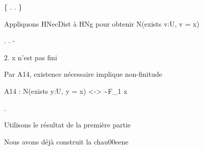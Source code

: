 \documentclass[10pt]{report}
\begin{document}
\begin{coqdoccode}
\coqdocindent{2.00em}
\{  .  . \}\coqdoceol
\coqdocindent{2.00em}
\coqdoceol
\coqdocindent{2.00em}
\begin{coqdoccomment}
\coqdocindent{0.50em}
Appliquons\coqdocindent{0.50em}
HNecDist\coqdocindent{0.50em}
à\coqdocindent{0.50em}
HNg\coqdocindent{0.50em}
pour\coqdocindent{0.50em}
obtenir\coqdocindent{0.50em}
N(exists\coqdocindent{0.50em}
v:U,\coqdocindent{0.50em}
v\coqdocindent{0.50em}
=\coqdocindent{0.50em}
x)\coqdocindent{0.50em}
\end{coqdoccomment}
\coqdoceol
\coqdocindent{2.00em}
 .  .\coqdoceol
\coqdocemptyline
\coqdocindent{1.00em}
- \begin{coqdoccomment}
\coqdocindent{0.50em}
2.\coqdocindent{0.50em}
x\coqdocindent{0.50em}
n'est\coqdocindent{0.50em}
pas\coqdocindent{0.50em}
fini\coqdocindent{0.50em}
\end{coqdoccomment}
\coqdoceol
\coqdocindent{2.00em}
\begin{coqdoccomment}
\coqdocindent{0.50em}
Par\coqdocindent{0.50em}
A14,\coqdocindent{0.50em}
existence\coqdocindent{0.50em}
nécessaire\coqdocindent{0.50em}
implique\coqdocindent{0.50em}
non-finitude\coqdocindent{0.50em}
\end{coqdoccomment}
\coqdoceol
\coqdocindent{2.00em}
\begin{coqdoccomment}
\coqdocindent{0.50em}
A14\coqdocindent{0.50em}
:\coqdocindent{0.50em}
N(exists\coqdocindent{0.50em}
y:U,\coqdocindent{0.50em}
y\coqdocindent{0.50em}
=\coqdocindent{0.50em}
x)\coqdocindent{0.50em}
<->\coqdocindent{0.50em}
\~{}F\_1\coqdocindent{0.50em}
x\coqdocindent{0.50em}
\end{coqdoccomment}
\coqdoceol
\coqdocindent{2.00em}
 .\coqdoceol
\coqdocemptyline
\coqdocindent{2.00em}
\begin{coqdoccomment}
\coqdocindent{0.50em}
Utilisons\coqdocindent{0.50em}
le\coqdocindent{0.50em}
résultat\coqdocindent{0.50em}
de\coqdocindent{0.50em}
la\coqdocindent{0.50em}
première\coqdocindent{0.50em}
partie\coqdocindent{0.50em}
\end{coqdoccomment}
\coqdoceol
\coqdocindent{2.00em}
\begin{coqdoccomment}
\coqdocindent{0.50em}
Nous\coqdocindent{0.50em}
avons\coqdocindent{0.50em}
déjà\coqdocindent{0.50em}
construit\coqdocindent{0.50em}
la\coqdocindent{0.50em}
chau00eene\coqdocindent{0.50em}

\end{coqdoccomment}
\end{coqdoccode}
\end{document}
